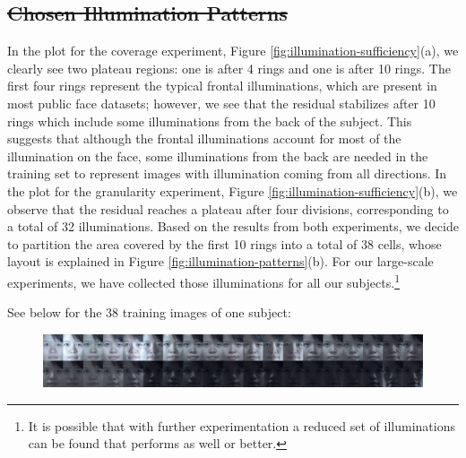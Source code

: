 \documentclass[12pt,journal,draftcls,letterpaper,onecolumn]{IEEEtran}
\providecommand{\DIFdel}[1]{{\protect\color{red}\sout{#1}}}                      %
\providecommand{\DIFdelbegin}{} %
\providecommand{\DIFdelend}{} %
\begin{document}
 \DIFdelbegin \subsection{\DIFdel{Chosen Illumination Patterns}} %
\addtocounter{subsection}{-1}%
\DIFdelend In the plot for the
coverage experiment, Figure \ref{fig:illumination-sufficiency}(a),
 we clearly see two plateau regions: one is after 4 rings
and one is after 10 rings. The first four rings represent the
typical frontal illuminations, which are present in most public
face datasets; however, we see that the residual stabilizes
after 10 rings which include some illuminations from the back
of the subject. This suggests that although the frontal
illuminations account for most of the illumination on the face,
some illuminations from the back are needed in the training set to
represent images with illumination coming from all directions.
In the plot for the granularity experiment, Figure
\ref{fig:illumination-sufficiency}(b), we observe that the
residual reaches a plateau after four divisions, corresponding
to a total of 32 illuminations. Based on the results from both
experiments, we decide to partition the area covered by the
first 10 rings into a total of 38 cells, whose layout is
explained in Figure \ref{fig:illumination-patterns}(b). For
our large-scale experiments, we have collected those
illuminations for all our subjects.\footnote{It is possible
that with further experimentation a reduced set of illuminations
can be found that performs as well or better.}

See below for the 38 training images of one subject:
\begin{figure}[h]
\centering
\includegraphics[width=6.3in]{figures_cvpr/training.png}
\vspace{-.3in}
\end{figure}
\end{document}
